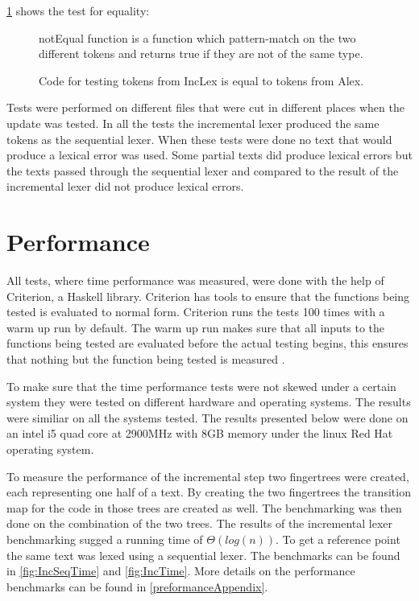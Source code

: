 \cref{fig:CheckEquility} shows the test for equality:
\begin{figure}[h!]
  \centering
  
  notEqual function is a function which pattern-match on the two different
  tokens and returns true if they are not of the same type.
  \caption{Code for testing tokens from IncLex is equal to tokens from Alex. 
  \label{fig:CheckEquility}}
\end{figure}

Tests were performed on different files that were cut in different places when
the update was tested. In all the tests the incremental lexer produced the same
tokens as the sequential lexer. When these tests were done no text that would
produce a lexical error was used. Some partial texts did produce lexical errors
but the texts passed through the sequential lexer and compared to the result of
the incremental lexer did not produce lexical errors.

\section{Performance}
All tests, where time performance was measured, were done with the help of
Criterion, a Haskell library. Criterion has tools to ensure that the functions
being tested is evaluated to normal form. Criterion runs the tests 100 times
with a warm up run by default. The warm up run makes sure that all inputs to the
functions being tested are evaluated before the actual testing begins, this
ensures that nothing but the function being tested is measured \cite{criterion}.

To make sure that the time performance tests were not skewed under a certain
system they were tested on different hardware and operating systems. The results
were similiar on all the systems tested. The results presented below were done
on an intel i5 quad core at 2900MHz with 8GB memory under the linux Red Hat
operating system.

To measure the performance of the incremental step two fingertrees were created,
each representing one half of a text. By creating the two fingertrees the
transition map for the code in those trees are created as well. The benchmarking
was then done on the combination of the two trees. The results of the incremental
lexer benchmarking sugged a running time of $\Theta(log(n))$. To get a reference
point the same text was lexed using a sequential lexer. The benchmarks can be
found in \cref{fig:IncSeqTime} and \cref{fig:IncTime}. More details on the
performance benchmarks can be found in \cref{preformanceAppendix}.

